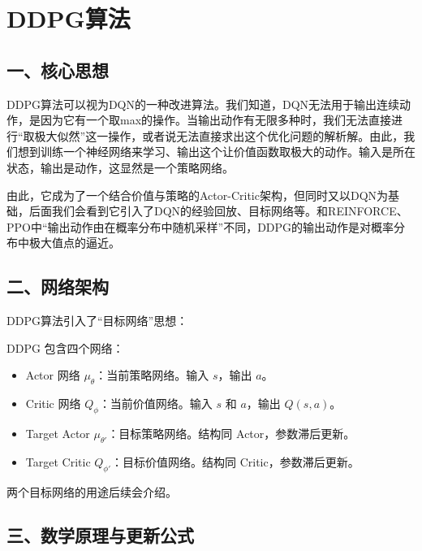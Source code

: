 \clearpage

\hypertarget{ddpgux7b97ux6cd5}{%
\section{DDPG算法}\label{ddpgux7b97ux6cd5}}

\hypertarget{ux4e00ux6838ux5fc3ux601dux60f3-3}{%
\subsection{一、核心思想}\label{ux4e00ux6838ux5fc3ux601dux60f3-3}}

DDPG算法可以视为DQN的一种改进算法。我们知道，DQN无法用于输出连续动作，是因为它有一个取max的操作。当输出动作有无限多种时，我们无法直接进行``取极大似然''这一操作，或者说无法直接求出这个优化问题的解析解。由此，我们想到训练一个神经网络来学习、输出这个让价值函数取极大的动作。输入是所在状态，输出是动作，这显然是一个策略网络。

由此，它成为了一个结合价值与策略的Actor-Critic架构，但同时又以DQN为基础，后面我们会看到它引入了DQN的经验回放、目标网络等。和REINFORCE、PPO中``输出动作由在概率分布中随机采样''不同，DDPG的输出动作是对概率分布中极大值点的逼近。

\hypertarget{ux4e8cux7f51ux7edcux67b6ux6784}{%
\subsection{二、网络架构}\label{ux4e8cux7f51ux7edcux67b6ux6784}}

DDPG算法引入了``目标网络''思想：

DDPG 包含四个网络：

\begin{itemize}
\tightlist
\item
  Actor 网络 \(\mu_\theta\)：当前策略网络。输入 \(s\)，输出 \(a\)。
\item
  Critic 网络 \(Q_\phi\)：当前价值网络。输入 \(s\) 和 \(a\)，输出 \(Q(s,a)\)。
\item
  Target Actor \(\mu_{\theta'}\)：目标策略网络。结构同 Actor，参数滞后更新。
\item
  Target Critic \(Q_{\phi'}\)：目标价值网络。结构同 Critic，参数滞后更新。
\end{itemize}

两个目标网络的用途后续会介绍。

\hypertarget{ux4e09ux6570ux5b66ux539fux7406ux4e0eux66f4ux65b0ux516cux5f0f}{%
\subsection{三、数学原理与更新公式}\label{ux4e09ux6570ux5b66ux539fux7406ux4e0eux66f4ux65b0ux516cux5f0f}}

